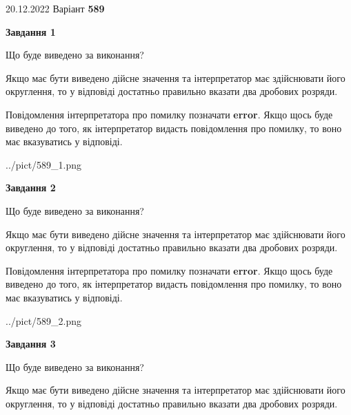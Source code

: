 \documentclass[12pt, ukrainian]{article}
\begin{document}
{20.12.2022 Варіант \No \textbf { 589 }\par}
{
\begin {Large}

{\begin {center}\textbf{Завдання 1}\end {center}}\par
Що буде виведено за виконання? \par

Якщо має бути виведено дійсне значення та інтерпретатор має здійснювати його округлення, 
то у відповіді достатньо правильно вказати два дробових розряди.

Повідомлення інтерпретатора про помилку позначати \textbf{error}.
Якщо щось буде виведено до того, як інтерпретатор видасть повідомлення про помилку, 
то воно має вказуватись у відповіді. \par

\begin{center}
	{../pict/589_1.png}
\end{center}
\newpage

{\begin {center}\textbf{Завдання 2}\end {center}}\par
Що буде виведено за виконання? \par

Якщо має бути виведено дійсне значення та інтерпретатор має здійснювати його округлення, 
то у відповіді достатньо правильно вказати два дробових розряди.

Повідомлення інтерпретатора про помилку позначати \textbf{error}.
Якщо щось буде виведено до того, як інтерпретатор видасть повідомлення про помилку, 
то воно має вказуватись у відповіді. \par

\begin{center}
	{../pict/589_2.png}
\end{center}
\newpage

{\begin {center}\textbf{Завдання 3}\end {center}}\par
Що буде виведено за виконання? \par

Якщо має бути виведено дійсне значення та інтерпретатор має здійснювати його округлення, 
то у відповіді достатньо правильно вказати два дробових розряди.


\end{Large}}
\end{document}
